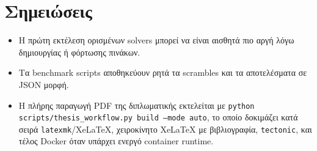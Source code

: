 \section{Σημειώσεις}

\begin{itemize}
    \item Η πρώτη εκτέλεση ορισμένων solvers μπορεί να είναι αισθητά πιο αργή λόγω δημιουργίας ή φόρτωσης πινάκων.
    \item Τα benchmark scripts αποθηκεύουν ρητά τα scrambles και τα αποτελέσματα σε JSON μορφή.
    \item Η πλήρης παραγωγή PDF της διπλωματικής εκτελείται με \texttt{python scripts/thesis\_workflow.py build --mode auto}, το οποίο δοκιμάζει κατά σειρά \texttt{latexmk}/XeLaTeX, χειροκίνητο XeLaTeX με βιβλιογραφία, \texttt{tectonic}, και τέλος Docker όταν υπάρχει ενεργό container runtime.
\end{itemize}
